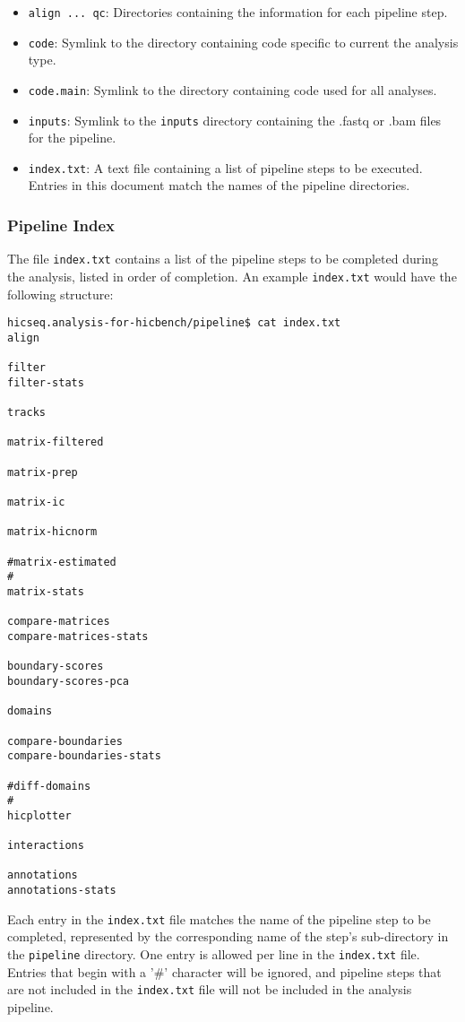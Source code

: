 \begin{itemize}
\item \texttt{align ... qc}: Directories containing the information for each pipeline step. 
\item \texttt{code}: Symlink to the directory containing code specific to current the analysis type.
\item \texttt{code.main}: Symlink to the directory containing code used for all analyses. 
\item \texttt{inputs}: Symlink to the \texttt{inputs} directory containing the .fastq or .bam files for the pipeline.
\item \texttt{index.txt}: A text file containing a list of pipeline steps to be executed. Entries in this document match the names of the pipeline directories. 
\end{itemize}

\subsubsection{Pipeline Index}
The file \texttt{index.txt} contains a list of the pipeline steps to be completed during the analysis, listed in order of completion. An example \texttt{index.txt} would have the following structure:

\begin{lstlisting}
hicseq.analysis-for-hicbench/pipeline$ cat index.txt
align

filter
filter-stats

tracks

matrix-filtered

matrix-prep

matrix-ic

matrix-hicnorm

#matrix-estimated
#
matrix-stats

compare-matrices
compare-matrices-stats

boundary-scores
boundary-scores-pca

domains

compare-boundaries
compare-boundaries-stats

#diff-domains
#
hicplotter

interactions

annotations
annotations-stats
\end{lstlisting}

Each entry in the \texttt{index.txt} file matches the name of the pipeline step to be completed, represented by the corresponding name of the step's sub-directory in the \texttt{pipeline} directory. One entry is allowed per line in the \texttt{index.txt} file. Entries that begin with a '\#' character will be ignored, and pipeline steps that are not included in the \texttt{index.txt} file will not be included in the analysis pipeline. 

